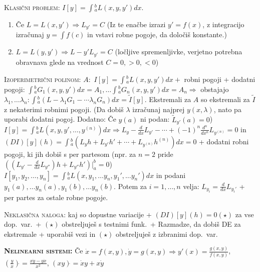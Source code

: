\documentclass[8pt,a4paper]{amsart}
\theoremstyle{definition} %
\theoremstyle{plain} %
\let\oldint\int
\renewcommand{\int}{\oldint \!}
\begin{document}
\textsc{Klasični problem:} $I[y]=\int_a^bL(x,y,y')dx$.
\begin{enumerate}
\item Če $L=L(x,y') \Longrightarrow L_{y'}=C$ (Iz te enačbe izrazi $y' = f(x)$, z integracijo izračunaj $y = \int f(c) $ in vstavi robne pogoje, da določiš konstante.)
\item $L=L(y,y') \Longrightarrow L-y'L_{y'}=C$ (ločljive spremenljivke, verjetno potrebna obravnava glede na vrednost $C = 0, >0, <0$)
\end{enumerate}

\textsc{Izoperimetrični polinom:} $A:$ $I[y]=\int_a^bL(x,y,y')dx +$ robni pogoji + dodatni pogoji: $\int_a^bG_1(x,y,y')dx = A_1, \ldots \int_a^bG_n(x,y,y')dx=A_n \Longrightarrow $ obstajajo $\lambda_1,\ldots \lambda_n: \int_a^b(L-\lambda_1G_1-\cdots \lambda_nG_n)dx = \tilde{I}[y]$. Ekstremali za $A$ so ekstremali za $\tilde{I}$ z nekaterimi robnimi pogoji. (Da dobiš $\lambda $ izračunaj najprej $y (x,\lambda)$, nato pa uporabi dodatni pogoj. Dodatno: Če $y(a)$ ni podan: $\tilde{L}_{y'}(a)=0$)
\\

$I[y]=\int_a^bL(x,y,y',\ldots ,y^{(n)})dx \Longrightarrow L_y -\frac{d}{dx}L_{y'} - \cdots + (-1)^n \frac{d^n}{dx^n}L_{y^{(n)}}=0$ in $(DI)[y](h) = \int_a^b (L_y h + L_{y'} h' + \cdots + L_{y^{(n)}} h^{(n)}) dx = 0$ + dodatni robni pogoji, ki jih dobiš s per partesom (npr. za $n = 2$ pride $((L_{y'} - \frac{d}{dx} L_{y''}) h + L_{y''} h')|_a^b = 0$)
\\

$I[y_1,y_2,\ldots ,y_n] = \int_a^b L(x,y_1,\ldots y_n, y_1',\ldots y_n')dx$ in podani $y_1(a),\ldots y_n(a), y_1(b),\ldots y_n(b)$. Potem za $i = 1,\ldots ,n$ velja: $L_{y_i} = \frac{d}{dx}L_{y_i'}$ + per partes za ostale robne pogoje.

\textsc{Neklasična naloga:} kaj so dopustne variacije + $(DI)[y](h) = 0 (\star)$ za vse dop.\ var.\ + $(\star)$ obstreljuješ s testnimi funk.\ + Razmadze, da dobiš DE za ekstremale + uporabiš vezi in $(\star)$ obstreljuješ z izbranimi dop.\ var.\ 

\textbf{\textsc{Nelinearni sistemi:}} Če $\dot{x} = f(x,y), \dot{y} = g(x,y) \Longrightarrow y'(x)=\frac{g(x,y)}{f(x,y)}$, $(\frac{y}{x})\dot{ } = \frac{x\dot{y}-y\dot{x}}{x^2}$, $(xy)\dot{ } = \dot{x}y+x\dot{y}$
%
%
\end{document}
